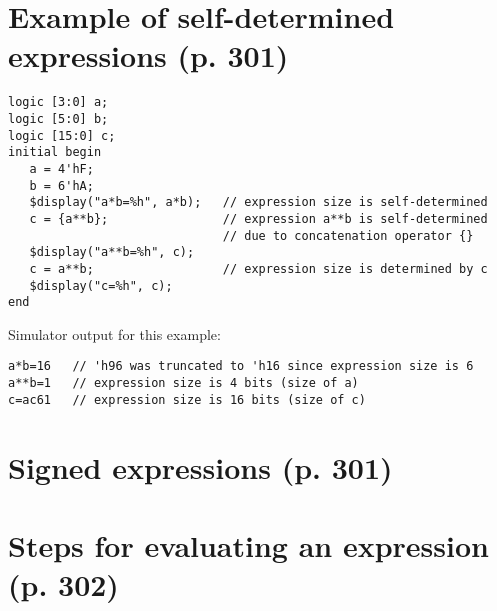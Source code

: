 \documentclass{article}
\begin{document}
{
  \color{red}

  \section{Example of self-determined expressions (p. 301)}

  \begin{verbatim}
logic [3:0] a;
logic [5:0] b;
logic [15:0] c;
initial begin
   a = 4'hF;
   b = 6'hA;
   $display("a*b=%h", a*b);   // expression size is self-determined
   c = {a**b};                // expression a**b is self-determined
                              // due to concatenation operator {}
   $display("a**b=%h", c);
   c = a**b;                  // expression size is determined by c
   $display("c=%h", c);
end
\end{verbatim}

  Simulator output for this example:
  \begin{verbatim}
a*b=16   // 'h96 was truncated to 'h16 since expression size is 6
a**b=1   // expression size is 4 bits (size of a)
c=ac61   // expression size is 16 bits (size of c)
\end{verbatim}

}

\renewcommand{\thesection}{11.\arabic{section}}
\setcounter{section}{6}

\section{Signed expressions (p. 301)}

\textelp{}

\renewcommand{\thesection}{11.8.\arabic{section}}
\setcounter{section}{1}

\section{Steps for evaluating an expression (p. 302)}
\end{document}
